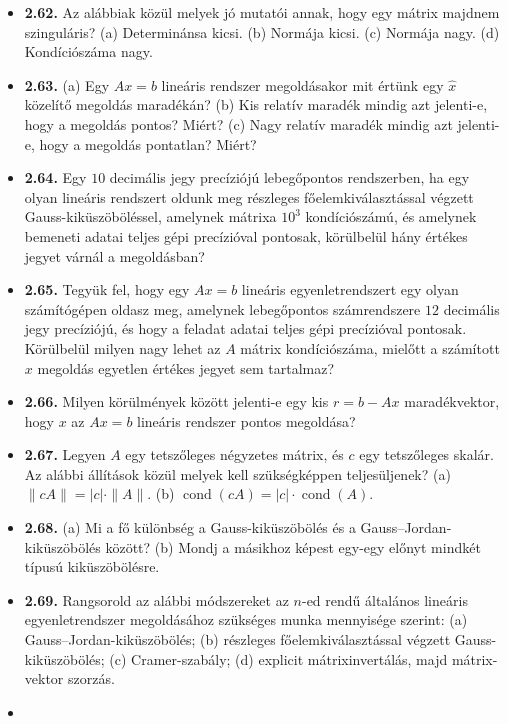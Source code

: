 \documentclass[
  magyar,
  11pt]{article}
\providecommand{\tightlist}{%
  \setlength{\itemsep}{0pt}\setlength{\parskip}{0pt}}
\begin{document}
\begin{itemize}
\tightlist
\item
  \textbf{2.62.} Az alábbiak közül melyek jó mutatói annak, hogy egy
  mátrix majdnem szinguláris? (a) Determinánsa kicsi. (b) Normája kicsi.
  (c) Normája nagy. (d) Kondíciószáma nagy.
\item
  \textbf{2.63.} (a) Egy \(Ax = b\) lineáris rendszer megoldásakor mit
  értünk egy \(\hat{x}\) közelítő megoldás maradékán? (b) Kis relatív
  maradék mindig azt jelenti-e, hogy a megoldás pontos? Miért? (c) Nagy
  relatív maradék mindig azt jelenti-e, hogy a megoldás pontatlan?
  Miért?
\item
  \textbf{2.64.} Egy \(10\) decimális jegy precíziójú lebegőpontos
  rendszerben, ha egy olyan lineáris rendszert oldunk meg részleges
  főelemkiválasztással végzett Gauss-kiküszöböléssel, amelynek mátrixa
  \(10^3\) kondíciószámú, és amelynek bemeneti adatai teljes gépi
  precízióval pontosak, körülbelül hány értékes jegyet várnál a
  megoldásban?
\item
  \textbf{2.65.} Tegyük fel, hogy egy \(Ax = b\) lineáris
  egyenletrendszert egy olyan számítógépen oldasz meg, amelynek
  lebegőpontos számrendszere \(12\) decimális jegy precíziójú, és hogy a
  feladat adatai teljes gépi precízióval pontosak. Körülbelül milyen
  nagy lehet az \(A\) mátrix kondíciószáma, mielőtt a számított \(x\)
  megoldás egyetlen értékes jegyet sem tartalmaz?
\item
  \textbf{2.66.} Milyen körülmények között jelenti-e egy kis
  \(r = b - Ax\) maradékvektor, hogy \(x\) az \(Ax = b\) lineáris
  rendszer pontos megoldása?
\item
  \textbf{2.67.} Legyen \(A\) egy tetszőleges négyzetes mátrix, és \(c\)
  egy tetszőleges skalár. Az alábbi állítások közül melyek kell
  szükségképpen teljesüljenek? (a) \(\|cA\| = |c| \cdot \|A\|\). (b)
  \(\operatorname{cond}(cA) = |c| \cdot \operatorname{cond}(A)\).
\item
  \textbf{2.68.} (a) Mi a fő különbség a Gauss-kiküszöbölés és a
  Gauss--Jordan-kiküszöbölés között? (b) Mondj a másikhoz képest egy-egy
  előnyt mindkét típusú kiküszöbölésre.
\item
  \textbf{2.69.} Rangsorold az alábbi módszereket az \(n\)-ed rendű
  általános lineáris egyenletrendszer megoldásához szükséges munka
  mennyisége szerint: (a) Gauss--Jordan-kiküszöbölés; (b) részleges
  főelemkiválasztással végzett Gauss-kiküszöbölés; (c) Cramer-szabály;
  (d) explicit mátrixinvertálás, majd mátrix-vektor szorzás.
\item

\end{itemize}
\end{document}
